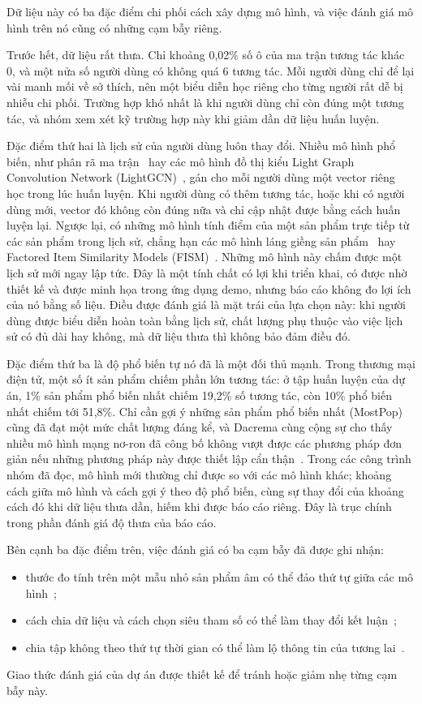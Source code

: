 Dữ liệu này có ba đặc điểm chi phối cách xây dựng mô hình, và việc đánh giá mô hình trên nó cũng có những cạm bẫy riêng.

Trước hết, dữ liệu rất thưa. Chỉ khoảng 0,02\% số ô của ma trận tương tác khác 0, và một nửa số người dùng có không quá 6 tương tác. Mỗi người dùng chỉ để lại vài manh mối về sở thích, nên một biểu diễn học riêng cho từng người rất dễ bị nhiễu chi phối. Trường hợp khó nhất là khi người dùng chỉ còn đúng một tương tác, và nhóm xem xét kỹ trường hợp này khi giảm dần dữ liệu huấn luyện.

Đặc điểm thứ hai là lịch sử của người dùng luôn thay đổi. Nhiều mô hình phổ biến, như phân rã ma trận~\cite{koren2009mf} hay các mô hình đồ thị kiểu Light Graph Convolution Network (LightGCN)~\cite{he2020lightgcn}, gán cho mỗi người dùng một vector riêng học trong lúc huấn luyện. Khi người dùng có thêm tương tác, hoặc khi có người dùng mới, vector đó không còn đúng nữa và chỉ cập nhật được bằng cách huấn luyện lại. Ngược lại, có những mô hình tính điểm của một sản phẩm trực tiếp từ các sản phẩm trong lịch sử, chẳng hạn các mô hình láng giềng sản phẩm~\cite{sarwar2001itembased,ning2011slim,steck2019ease} hay Factored Item Similarity Models (FISM)~\cite{kabbur2013fism}. Những mô hình này chấm được một lịch sử mới ngay lập tức. Đây là một tính chất có lợi khi triển khai, có được nhờ thiết kế và được minh họa trong ứng dụng demo, nhưng báo cáo không đo lợi ích của nó bằng số liệu. Điều được đánh giá là mặt trái của lựa chọn này: khi người dùng được biểu diễn hoàn toàn bằng lịch sử, chất lượng phụ thuộc vào việc lịch sử có đủ dài hay không, mà dữ liệu thưa thì không bảo đảm điều đó.

Đặc điểm thứ ba là độ phổ biến tự nó đã là một đối thủ mạnh. Trong thương mại điện tử, một số ít sản phẩm chiếm phần lớn tương tác: ở tập huấn luyện của dự án, 1\% sản phẩm phổ biến nhất chiếm 19,2\% số tương tác, còn 10\% phổ biến nhất chiếm tới 51,8\%. Chỉ cần gợi ý những sản phẩm phổ biến nhất (MostPop) cũng đã đạt một mức chất lượng đáng kể, và Dacrema cùng cộng sự cho thấy nhiều mô hình mạng nơ-ron đã công bố không vượt được các phương pháp đơn giản nếu những phương pháp này được thiết lập cẩn thận~\cite{dacrema2019progress}. Trong các công trình nhóm đã đọc, mô hình mới thường chỉ được so với các mô hình khác; khoảng cách giữa mô hình và cách gợi ý theo độ phổ biến, cùng sự thay đổi của khoảng cách đó khi dữ liệu thưa dần, hiếm khi được báo cáo riêng. Đây là trục chính trong phần đánh giá độ thưa của báo cáo.

Bên cạnh ba đặc điểm trên, việc đánh giá có ba cạm bẫy đã được ghi nhận:
\begin{itemize}
\item thước đo tính trên một mẫu nhỏ sản phẩm âm có thể đảo thứ tự giữa các mô hình~\cite{krichene2020sampled};
\item cách chia dữ liệu và cách chọn siêu tham số có thể làm thay đổi kết luận~\cite{sun2020rigorous};
\item chia tập không theo thứ tự thời gian có thể làm lộ thông tin của tương lai~\cite{ji2023leakage}.
\end{itemize}
Giao thức đánh giá của dự án được thiết kế để tránh hoặc giảm nhẹ từng cạm bẫy này.

